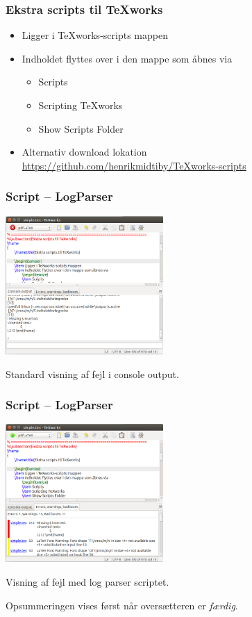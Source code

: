\documentclass{beamer}
\begin{document}
\frame
{
	\frametitle{Ekstra scripts til TeXworks}
		
	\begin{itemize}
	\item Ligger i TeXworks-scripts mappen
	\item Indholdet flyttes over i den mappe som åbnes via 
		\begin{itemize}
		\item Scripts 
		\item Scripting TeXworks 
		\item Show Scripts Folder
		\end{itemize}
	\item Alternativ download lokation \\
		{\tiny \url{https://github.com/henrikmidtiby/TeXworks-scripts}}
	\end{itemize}
}

\begin{frame}
\frametitle{Script -- LogParser}

\includegraphics[width=6cm]{pic/texworksConsoleOutput.png}

Standard visning af fejl i console output.

\end{frame}

\begin{frame}
\frametitle{Script -- LogParser}

\includegraphics[width=6cm]{pic/texworksLogParser.png}

Visning af fejl med log parser scriptet.

Opsummeringen vises først når oversætteren er \emph{færdig}.

\end{frame}
\end{document}

